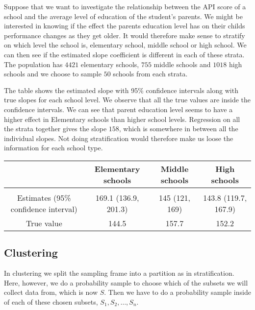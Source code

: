 \documentclass{article}
\begin{document}
\begin{example}
  Suppose that we want to investigate the relationship between the API score of
  a school and the average level of education of the student's parents. We might
  be interested in knowing if the effect the parents education level has on
  their childs performance changes as they get older. It would therefore make
  sense to stratify on which level the school is, elementary school, middle
  school or high school. We can then see if the estimated slope coefficient is
  different in each of these strata.
  The population has \(4421\) elementary schools, \(755\) middle schools and
  \(1018\) high schools and we choose to sample \(50\) schools from each strata.

  The table shows the estimated slope with 95\% confidence intervals along with
  true slopes for each school level. We observe that all the true values are
  inside the confidence intervals. We can see that
  parent education level seems to have a higher effect in Elementary schools
  than higher school levels. Regression on all the strata together gives the
  slope \(158\), which is somewhere in between all the individual slopes. Not
  doing stratification would therefore make us loose the information for each
  school type.

  \begin{center}
  \begin{tabular}{c|ccc}
    & Elementary schools & Middle schools & High schools \\
    \hline \\
    Estimates (95\% confidence interval) & 169.1 (136.9, 201.3) & 145 (121, 169) & 143.8 (119.7, 167.9) \\
    True value & 144.5 & 157.7 & 152.2
  \end{tabular}
  \end{center}
\end{example}


\subsection{Clustering} \label{sec:clustering}


In clustering we split the sampling frame into a partition as in stratification.
Here, however, we do a probability sample to choose which of the subsets we will
collect data from, which is now \(S\). Then we have to do a probability sample
inside of each of these chosen subsets, \(S_1, S_2, \dots, S_n\).
\end{document}

